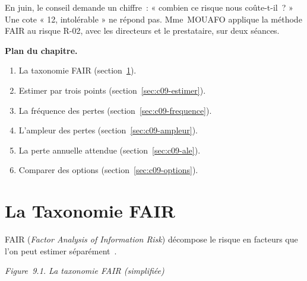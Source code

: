En juin, le conseil demande un chiffre~: « combien ce risque nous
coûte-t-il~? » Une cote « 12, intolérable » ne répond pas. Mme~MOUAFO
applique la méthode FAIR au risque R-02, avec les directeurs et le
prestataire, sur deux séances.

\medskip
\textbf{Plan du chapitre.}
\begin{enumerate}
    \item La taxonomie FAIR (section~\ref{sec:c09-taxonomie}).
    \item Estimer par trois points (section~\ref{sec:c09-estimer}).
    \item La fréquence des pertes (section~\ref{sec:c09-frequence}).
    \item L'ampleur des pertes (section~\ref{sec:c09-ampleur}).
    \item La perte annuelle attendue (section~\ref{sec:c09-ale}).
    \item Comparer des options (section~\ref{sec:c09-options}).
\end{enumerate}

\separateur

\section{La Taxonomie FAIR}
\label{sec:c09-taxonomie}

FAIR (\emph{Factor Analysis of Information Risk}) décompose le risque en
facteurs que l'on peut estimer séparément~\cite{freund2014fair}.

\begin{center}
\end{center}
\vspace{-0.4em}
\begin{center}{\small\itshape Figure~9.1. La taxonomie FAIR (simplifiée)}\end{center}

